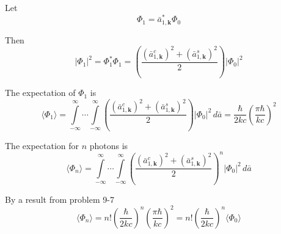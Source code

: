 \documentclass[12pt]{article}
\newcommand\U{\vert\Phi_0\vert^2}
\begin{document}
Let
\begin{equation*}
\Phi_1=\bar a_{1,\mathbf k}^*\Phi_0
\end{equation*}

Then
\begin{equation*}
\vert\Phi_1\vert^2
=\Phi_1^*\Phi_1
=\left(\frac{(\bar a_{1,\mathbf k}^c)^2+(\bar a_{1,\mathbf k}^s)^2}{2}\right)
\U
\end{equation*}

The expectation of $\Phi_1$ is
\begin{equation*}
\langle\Phi_1\rangle=
\int\limits_{-\infty}^\infty\cdots
\int\limits_{-\infty}^\infty
\left(\frac{(\bar a_{1,\mathbf k}^c)^2+(\bar a_{1,\mathbf k}^s)^2}{2}\right)
\U\,d\bar a
=\frac{\hbar}{2kc}
\left(\frac{\pi\hbar}{kc}\right)^2
\tag{2}
\end{equation*}

The expectation for $n$ photons is
\begin{equation*}
\langle\Phi_n\rangle=
\int\limits_{-\infty}^\infty\cdots
\int\limits_{-\infty}^\infty
\left(\frac{(\bar a_{1,\mathbf k}^c)^2+(\bar a_{1,\mathbf k}^s)^2}{2}\right)^n
\U\,d\bar a
\end{equation*}

By a result from problem 9-7
\begin{equation*}
\langle\Phi_n\rangle
=n!\left(\frac{\hbar}{2kc}\right)^n\left(\frac{\pi\hbar}{kc}\right)^2
=n!\left(\frac{\hbar}{2kc}\right)^n\langle\Phi_0\rangle
\tag{3}
\end{equation*}
\end{document}
